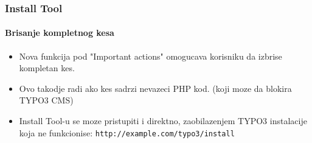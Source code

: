 
\begin{frame}[fragile]
	\frametitle{Install Tool}
	\framesubtitle{Brisanje kompletnog kesa}

	\begin{itemize}
		\item Nova funkcija pod "Important actions" omogucava korisniku da izbrise kompletan kes.
		\item Ovo takodje radi ako kes sadrzi nevazeci PHP kod.\newline
			(koji moze da blokira TYPO3 CMS)
		\item Install Tool-u se moze pristupiti i direktno, zaobilazenjem TYPO3 instalacije koja ne funkcionise: \texttt{http://example.com/typo3/install}
	\end{itemize}


\end{frame}

